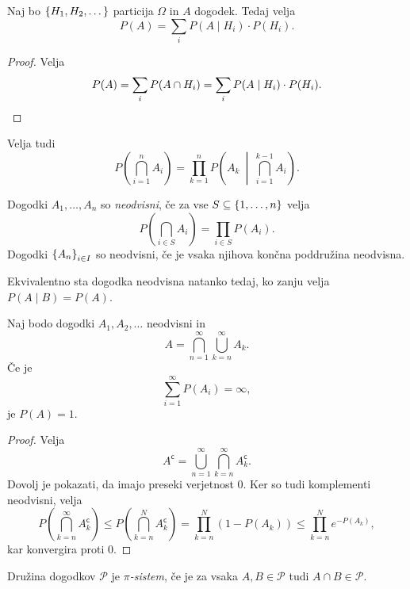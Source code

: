 \begin{izrek}
Naj bo $\left\{H_1, H_2, \dots\right\}$ particija $\Omega$ in $A$ dogodek.
Tedaj velja
\[
P(A) = \sum_i P(A \mid H_i) \cdot P(H_i).
\]
\end{izrek}

\begin{proof}
Velja
\[
P(A) = \sum_i P(A \cap H_i) = \sum_i P(A \mid H_i) \cdot P(H_i).
\qedhere
\]
\end{proof}

\begin{opomba}
Velja tudi
\[
P\left(\bigcap_{i=1}^n A_i\right) =
\prod_{k=1}^n P\left(A_k~\middle|~\bigcap_{i=1}^{k-1} A_i\right).
\]
\end{opomba}


\begin{definicija}
Dogodki $A_1, \dots, A_n$ so
\emph{neodvisni}, če za vse
$S \subseteq \left\{1,\dots,n\right\}$ velja
\[
P\left(\bigcap_{i \in S} A_i\right) = \prod_{i \in S} P(A_i).
\]
Dogodki $\left\{A_n\right\}_{i \in I}$ so neodvisni, če je vsaka njihova
končna poddružina neodvisna.
\end{definicija}

\begin{opomba}
Ekvivalentno sta dogodka neodvisna natanko tedaj, ko zanju velja
$P(A \mid B) = P(A)$.
\end{opomba}


\begin{izrek}
Naj bodo dogodki $A_1, A_2, \dots$ neodvisni in
\[
A = \bigcap_{n=1}^\infty \bigcup_{k=n}^\infty A_k.
\]
Če je
\[
\sum_{i=1}^\infty P(A_i) = \infty,
\]
je $P(A) = 1$.
\end{izrek}

\begin{proof}
Velja
\[
A^{\mathsf{c}} =
\bigcup_{n=1}^\infty \bigcap_{k=n}^\infty A_k^{\mathsf{c}}.
\]
Dovolj je pokazati, da imajo preseki verjetnost $0$. Ker so tudi
komplementi neodvisni, velja
\[
P\left(\bigcap_{k=n}^\infty A_k^{\mathsf{c}}\right) \leq
P\left(\bigcap_{k=n}^N A_k^{\mathsf{c}}\right) =
\prod_{k=n}^N (1 - P(A_k)) \leq
\prod_{k=n}^N e^{-P(A_k)},
\]
kar konvergira proti $0$.
\end{proof}

\begin{definicija}
Družina dogodkov $\mathcal{P}$ je \emph{$\pi$-sistem}, če je za
vsaka $A, B \in \mathcal{P}$ tudi $A \cap B \in \mathcal{P}$.
\end{definicija}

